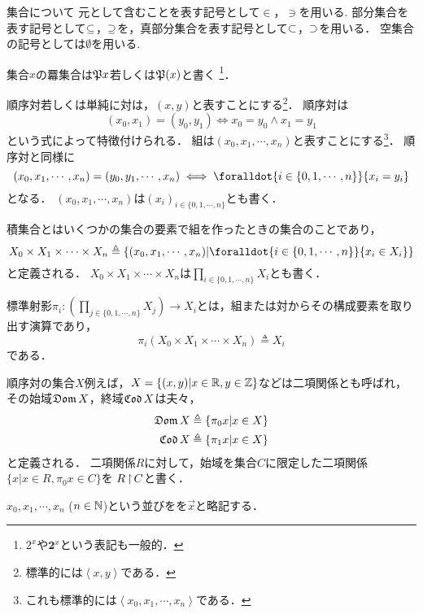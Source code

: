 \documentclass[a4paper,titlepage,report]{jsbook}
\begin{document}
\begin{resbonsiblesection}{集合について}{\sakamoto}\label{sc:about-set}
元として含むことを表す記号として$\in$，$\ni$を用いる.  部分集合を表す記号として$\subseteq$，$\supseteq$を，真部分集合を表す記号として$\subset$，$\supset$を用いる． 空集合の記号としては$\emptyset$を用いる.

集合$x$の羃集合は$\mathfrak{P} x$若しくは$\mathfrak{P}(x)$と書く
\footnote{$2^x$や$\boldsymbol{2}^x$という表記も一般的．}．

順序対若しくは単純に対は，$(x,y)$と表すことにする\footnote{標準的には$\left\langle x,y\right\rangle$である．}．
順序対は
\begin{equation}
(x_0,x_1) = (y_0,y_1) \iff x_0 = y_0 \land x_1 = y_1
\end{equation}
という式によって特徴付けられる．
組は$(x_0,x_1,\cdots,x_n)$と表すことにする\footnote{これも標準的には$\left\langle x_0,x_1,\cdots,x_n\right\rangle$である．}．
順序対と同様に
\begin{equation}
(x_0,x_1,\cdots,x_n) = (y_0,y_1,\cdots,x_n) \iff \foralldot{i\in\{0,1,\cdots,n\}}{x_i = y_i}
\end{equation}
となる．
$(x_0,x_1,\cdots,x_n)$は$(x_i)_{i\in\{0,1,\cdots,n\}}$とも書く．

積集合とはいくつかの集合の要素で組を作ったときの集合のことであり，
\begin{equation}
X_0\times X_1\times\cdots\times X_n\triangleq \{(x_0,x_1,\cdots,x_n)|\foralldot{i\in\{0,1,\cdots,n\}}{x_i\in X_i}\}
\end{equation}
と定義される．
$X_0\times X_1\times\cdots\times X_n$は$\prod_{i\in\{0,1,\cdots,n\}} X_i$とも書く．

標準射影$\pi_i:\left(\prod_{j\in\{0,1,\cdots,n\}} X_j\right)\rightarrow X_i$とは，組または対からその構成要素を取り出す演算であり，
\begin{equation}
\pi_i(X_0\times X_1\times\cdots\times X_n)\triangleq X_i
\end{equation}
である．

順序対の集合$X$\jpdash 例えば，$X=\{(x,y)|x\in\mathbb{R},y\in\mathbb{Z}\}$など\jpdash は二項関係とも呼ばれ，
その始域$\mathop{\mathfrak{Dom}} X$，終域$\mathop{\mathfrak{Cod}} X$は夫々，
\begin{align}
    \mathop{\mathfrak{Dom}} X &\triangleq \{\pi_0 x|x\in X\}\\
    \mathop{\mathfrak{Cod}} X &\triangleq \{\pi_1 x|x\in X\}
\end{align}
と定義される．
二項関係$R$に対して，始域を集合$C$に限定した二項関係$\{x|x\in R, \pi_0 x\in C\}$を
$R\mathop{\upharpoonright}C$と書く．

$x_0,x_1,\cdots,x_n$ ($n\in\mathbb{N}$)という並びをを$\vec{x}$と略記する．

\end{resbonsiblesection}
\end{document}

